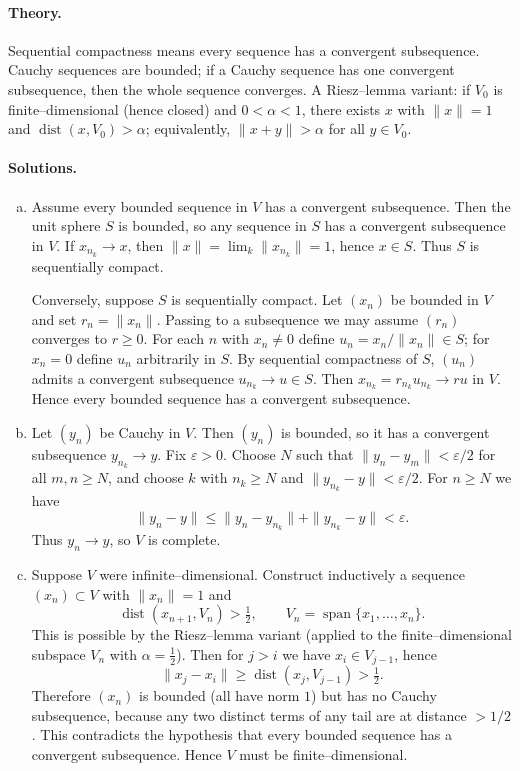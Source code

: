 \documentclass[12pt,a4paper]{article}
\theoremstyle{plain}
\theoremstyle{definition}
\theoremstyle{remark}
\theoremstyle{remark}
\begin{document}
\paragraph{Theory.}
Sequential compactness means every sequence has a convergent subsequence.
Cauchy sequences are bounded; if a Cauchy sequence has one convergent subsequence, then the whole sequence converges.
A Riesz--lemma variant: if $V_0$ is finite--dimensional (hence closed) and $0<\alpha<1$, there exists $x$ with $\|x\|=1$ and
$\operatorname{dist}(x,V_0)>\alpha$; equivalently, $\|x+y\|>\alpha$ for all $y\in V_0$.

\paragraph{Solutions.}
\begin{enumerate}[(a)]
	\item
	Assume every bounded sequence in $V$ has a convergent subsequence. Then the unit sphere $S$ is bounded,
	so any sequence in $S$ has a convergent subsequence in $V$. If $x_{n_k}\to x$, then
	$\|x\|=\lim_k\|x_{n_k}\|=1$, hence $x\in S$. Thus $S$ is sequentially compact.
	
	Conversely, suppose $S$ is sequentially compact. Let $(x_n)$ be bounded in $V$ and set $r_n=\|x_n\|$.
	Passing to a subsequence we may assume $(r_n)$ converges to $r\ge 0$.
	For each $n$ with $x_n\neq 0$ define $u_n=x_n/\|x_n\|\in S$; for $x_n=0$ define $u_n$ arbitrarily in $S$.
	By sequential compactness of $S$, $(u_n)$ admits a convergent subsequence $u_{n_k}\to u\in S$.
	Then $x_{n_k}=r_{n_k}u_{n_k}\to r u$ in $V$. Hence every bounded sequence has a convergent subsequence.
	
	\item
	Let $(y_n)$ be Cauchy in $V$. Then $(y_n)$ is bounded, so it has a convergent subsequence $y_{n_k}\to y$.
	Fix $\varepsilon>0$. Choose $N$ such that $\|y_n-y_m\|<\varepsilon/2$ for all $m,n\ge N$,
	and choose $k$ with $n_k\ge N$ and $\|y_{n_k}-y\|<\varepsilon/2$.
	For $n\ge N$ we have
	\[
	\|y_n-y\|\le \|y_n-y_{n_k}\|+\|y_{n_k}-y\|<\varepsilon.
	\]
	Thus $y_n\to y$, so $V$ is complete.
	
	\item[\textnormal{(c)$^*$}]
	Suppose $V$ were infinite--dimensional. Construct inductively a sequence $(x_n)\subset V$ with
	$\|x_n\|=1$ and
	\[
	\operatorname{dist}(x_{n+1},V_n)>\tfrac12,
	\qquad
	V_n=\operatorname{span}\{x_1,\dots,x_n\}.
	\]
	This is possible by the Riesz--lemma variant (applied to the finite--dimensional subspace $V_n$ with $\alpha=\tfrac12$).
	Then for $j>i$ we have $x_i\in V_{j-1}$, hence
	\[
	\|x_j-x_i\|\ge \operatorname{dist}(x_j,V_{j-1})>\tfrac12 .
	\]
	Therefore $(x_n)$ is bounded (all have norm $1$) but has no Cauchy subsequence, because any two distinct
	terms of any tail are at distance $>1/2$.
	This contradicts the hypothesis that every bounded sequence has a convergent subsequence.
	Hence $V$ must be finite--dimensional.
\end{enumerate}
\end{document}
